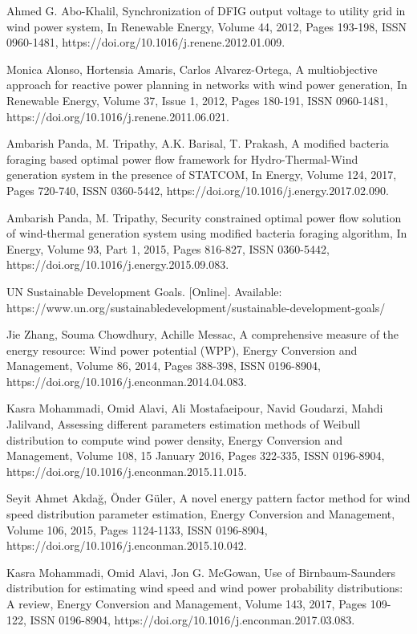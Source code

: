\begin{thebibliography}{99}
\begin{singlespace}
Ahmed G. Abo-Khalil, Synchronization of DFIG output voltage to utility grid in wind power system, In Renewable Energy, Volume 44, 2012, Pages 193-198, ISSN 0960-1481, https://doi.org/10.1016/j.renene.2012.01.009.

Monica Alonso, Hortensia Amaris, Carlos Alvarez-Ortega, A multiobjective approach for reactive power planning in networks with wind power generation, In Renewable Energy, Volume 37, Issue 1, 2012, Pages 180-191, ISSN 0960-1481, https://doi.org/10.1016/j.renene.2011.06.021.

Ambarish Panda, M. Tripathy, A.K. Barisal, T. Prakash, A modified bacteria foraging based optimal power flow framework for Hydro-Thermal-Wind generation system in the presence of STATCOM, In Energy, Volume 124, 2017, Pages 720-740, ISSN 0360-5442, https://doi.org/10.1016/j.energy.2017.02.090.

Ambarish Panda, M. Tripathy, Security constrained optimal power flow solution of wind-thermal generation system using modified bacteria foraging algorithm, In Energy, Volume 93, Part 1, 2015, Pages 816-827, ISSN 0360-5442, https://doi.org/10.1016/j.energy.2015.09.083.


 UN Sustainable Development Goals. [Online]. Available: https://www.un.org/sustainabledevelopment/sustainable-development-goals/

Jie Zhang, Souma Chowdhury, Achille Messac, A comprehensive measure of the energy resource: Wind power potential (WPP), Energy Conversion and Management, Volume 86, 2014, Pages 388-398, ISSN 0196-8904, https://doi.org/10.1016/j.enconman.2014.04.083.

Kasra Mohammadi, Omid Alavi, Ali Mostafaeipour, Navid Goudarzi, Mahdi Jalilvand, Assessing different parameters estimation methods of Weibull distribution to compute wind power density, Energy Conversion and Management, Volume 108, 15 January 2016, Pages 322-335, ISSN 0196-8904, https://doi.org/10.1016/j.enconman.2015.11.015.

 Seyit Ahmet Akdağ, Önder Güler, A novel energy pattern factor method for wind speed distribution parameter estimation, Energy Conversion and Management, Volume 106, 2015, Pages 1124-1133, ISSN 0196-8904, https://doi.org/10.1016/j.enconman.2015.10.042. 

 Kasra Mohammadi, Omid Alavi, Jon G. McGowan, Use of Birnbaum-Saunders distribution for estimating wind speed and wind power probability distributions: A review, Energy Conversion and Management, Volume 143, 2017, Pages 109-122, ISSN 0196-8904, https://doi.org/10.1016/j.enconman.2017.03.083.


\end{singlespace}
\end{thebibliography}
